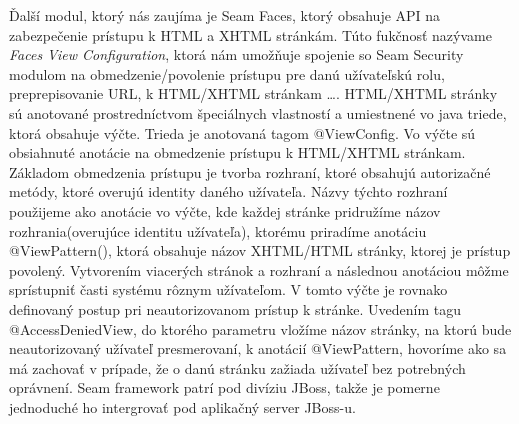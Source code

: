 \newline \indent Ďalší modul, ktorý nás zaujíma je Seam Faces, ktorý obsahuje API na zabezpečenie prístupu k HTML a XHTML stránkám. Túto fukčnosť nazývame \emph{Faces View Configuration}, ktorá nám umožňuje spojenie so Seam Security modulom na obmedzenie/povolenie prístupu pre danú užívateľskú rolu, preprepisovanie URL, k HTML/XHTML stránkam \ldots. HTML/XHTML stránky sú anotované prostredníctvom špeciálnych vlastností a umiestnené vo java triede, ktorá obsahuje výčte. Trieda je anotovaná tagom @ViewConfig. Vo výčte sú obsiahnuté anotácie na obmedzenie prístupu k HTML/XHTML stránkam. Základom  obmedzenia prístupu je tvorba rozhraní, ktoré obsahujú autorizačné metódy, ktoré overujú identity daného užívateľa. Názvy týchto rozhraní použijeme ako anotácie vo výčte, kde každej stránke pridružíme názov rozhrania(overujúce identitu užívateľa), ktorému priradíme anotáciu @ViewPattern(), ktorá obsahuje názov XHTML/HTML stránky, ktorej je prístup povolený. Vytvorením viacerých stránok a rozhraní a následnou anotáciou môžme sprístupniť časti systému rôznym užívateľom. V tomto výčte je rovnako definovaný postup pri neautorizovanom prístup k stránke. Uvedením tagu @AccessDeniedView, do ktorého parametru vložíme názov stránky, na ktorú bude neautorizovaný užívateľ presmerovaní, k anotácií @ViewPattern, hovoríme ako sa má zachovať v prípade, že o danú stránku zažiada užívateľ bez potrebných oprávnení. Seam framework patrí pod divíziu JBoss, takže je pomerne jednoduché ho intergrovať pod aplikačný server JBoss-u. 


